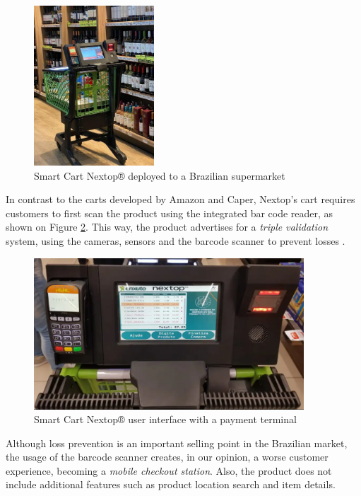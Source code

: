 \documentclass[openright]{normas-utf-tex} %
\begin{document}
\begin{figure}[H]
	\centering
	\includegraphics[width=0.4\textwidth]{./images/nextop.jpeg}
	\caption[Smart Cart Nextop® deployed to a Brazilian supermarket]{Smart Cart Nextop® deployed to a Brazilian supermarket}
	\label{fig:nextop}
\end{figure}

In contrast to the carts developed by Amazon and Caper, Nextop's cart
requires customers to first scan the product using the integrated bar code
reader, as shown on Figure \ref{fig:nextopui}. This way, the product advertises for a
\textit{triple validation} system, using the cameras, sensors and the barcode scanner 
to prevent losses \cite{Nextop2022}.

\begin{figure}[H]
	\centering
	\includegraphics[width=0.9\textwidth]{./images/nextop2.png}
    \caption[Smart Cart Nextop® user interface with a payment terminal]{Smart Cart Nextop® user interface with a payment terminal}
	\label{fig:nextopui}
\end{figure}

Although loss prevention is an important selling point in the Brazilian market,
the usage of the barcode scanner creates, in our opinion, a worse customer
experience, becoming a \textit{mobile checkout station}. Also, the product does not
include additional features such as product location search and item details. 
\end{document}
